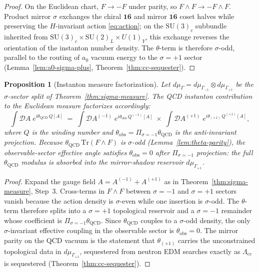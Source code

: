 \documentclass[11pt]{article}
\theoremstyle{plain}
\newtheorem{proposition}[theorem]{Proposition}
\theoremstyle{definition}
\theoremstyle{remark}
\numberwithin{equation}{section}
\begin{document}
\begin{proof}
On the Euclidean chart, $F\to -F$ under parity, so
$F\wedge F\to -F\wedge F$. Product mirror $\sigma$ exchanges the chiral
$\mathbf{16}$ and mirror $\overline{\mathbf{16}}$ coset halves while
preserving the $H$-invariant action \eqref{eq:action}; on the $\mathrm{SU}(3)_c$
subbundle inherited from $\mathrm{SU}(3)_c\times\mathrm{SU}(2)_L\times U(1)_Y$,
this exchange reverses the orientation of the instanton number density.
The $\theta$-term is therefore $\sigma$-odd, parallel to the routing of
$a_0$ vacuum energy to the $\sigma=+1$ sector
(Lemma~\ref{lem:a0-sigma-plus}, Theorem~\ref{thm:cc-sequester}).
\end{proof}

\begin{proposition}[Instanton measure factorization]
\label{prop:theta-measure}
Let $d\mu_\Gamma=d\mu_{\Gamma_{-1}}\otimes d\mu_{\Gamma_{+1}}$ be the
$\sigma$-sector split of Theorem~\ref{thm:sigma-measure}. The QCD instanton
contribution to the Euclidean measure factorizes accordingly:
\begin{equation}\label{eq:theta-measure}
  \int \mathcal{D}A\;
  e^{i\theta_{\mathrm{QCD}}\,Q[A]}
  \;=\;
  \int \mathcal{D}A^{(-1)}\;
  e^{i\theta_{\mathrm{obs}}\,Q^{(-1)}[A]}
  \;\times\;
  \int \mathcal{D}A^{(+1)}\;
  e^{i\theta_{(+1)}\,Q^{(+1)}[A]},
\end{equation}
where $Q$ is the winding number and
$\theta_{\mathrm{obs}}=\Pi_{\sigma=-1}\theta_{\mathrm{QCD}}$ is the
anti-invariant projection. Because
$\theta_{\mathrm{QCD}}\,\mathrm{Tr}(F\wedge F)$ is $\sigma$-odd
(Lemma~\ref{lem:theta-parity}), the observable-sector effective angle satisfies
$\theta_{\mathrm{obs}}=0$ after $\Pi_{\sigma=-1}$ projection: the full
$\theta_{\mathrm{QCD}}$ modulus is absorbed into the mirror-shadow reservoir
$d\mu_{\Gamma_{+1}}$.
\end{proposition}

\begin{proof}
Expand the gauge field $A=A^{(-1)}+A^{(+1)}$ as in
Theorem~\ref{thm:sigma-measure}, Step~3. Cross-terms in $F\wedge F$ between
$\sigma=-1$ and $\sigma=+1$ sectors vanish because the action density is
$\sigma$-even while one insertion is $\sigma$-odd. The $\theta$-term therefore
splits into a $\sigma=+1$ topological reservoir and a $\sigma=-1$ remainder
whose coefficient is $\Pi_{\sigma=-1}\theta_{\mathrm{QCD}}$. Since
$\theta_{\mathrm{QCD}}$ couples to a $\sigma$-odd density, the only
$\sigma$-invariant effective coupling in the observable sector is
$\theta_{\mathrm{obs}}=0$. The mirror parity on the QCD vacuum is the
statement that $\theta_{(+1)}$ carries the unconstrained topological data in
$d\mu_{\Gamma_{+1}}$, sequestered from neutron EDM searches exactly as
$\Lambda_{\mathrm{cc}}$ is sequestered (Theorem~\ref{thm:cc-sequester}).
\end{proof}
\end{document}

